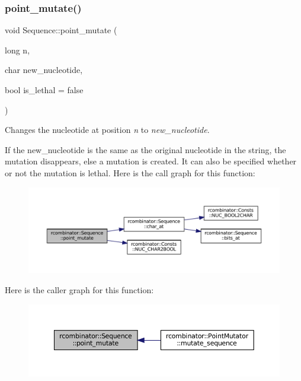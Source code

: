 \subsubsection{\texorpdfstring{point\+\_\+mutate()}{point\_mutate()}}
{\footnotesize\ttfamily void Sequence\+::point\+\_\+mutate (\begin{DoxyParamCaption}\item[{long}]{n,  }\item[{char}]{new\+\_\+nucleotide,  }\item[{bool}]{is\+\_\+lethal = {\ttfamily false} }\end{DoxyParamCaption})}



Changes the nucleotide at position {\itshape n} to {\itshape new\+\_\+nucleotide}. 

If the new\+\_\+nucleotide is the same as the original nucleotide in the string, the mutation disappears, else a mutation is created. It can also be specified whether or not the mutation is lethal. Here is the call graph for this function\+:
\nopagebreak
\begin{figure}[H]
\begin{center}
\leavevmode
\includegraphics[width=350pt]{classrcombinator_1_1Sequence_a5f7bccd4725bb8c46f6b93bd01a6b2f0_cgraph}
\end{center}
\end{figure}
Here is the caller graph for this function\+:\nopagebreak
\begin{figure}[H]
\begin{center}
\leavevmode
\includegraphics[width=350pt]{classrcombinator_1_1Sequence_a5f7bccd4725bb8c46f6b93bd01a6b2f0_icgraph}
\end{center}
\end{figure}


